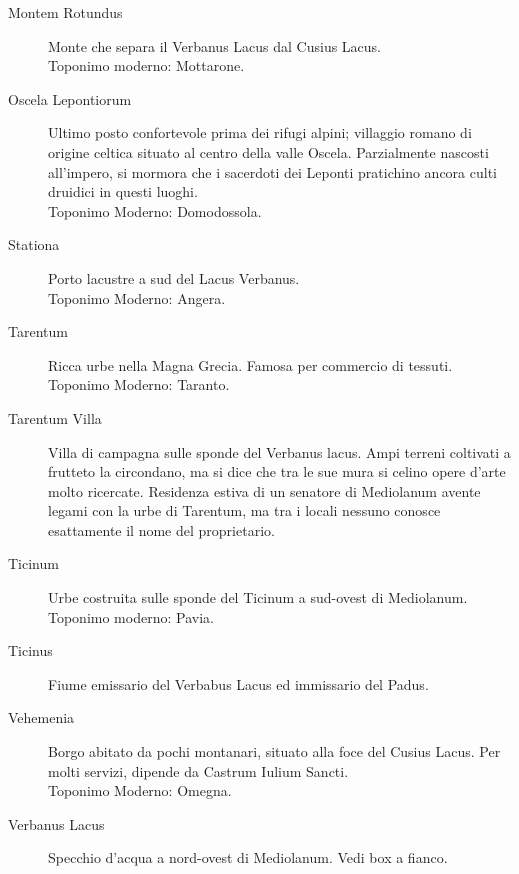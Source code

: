 \documentclass[11.5pt,twocolumn]{article}
\begin{document}
\begin{description}
\item[Montem Rotundus] Monte che separa il Verbanus Lacus dal Cusius Lacus.\\
Toponimo moderno: Mottarone.
\item[Oscela Lepontiorum] Ultimo posto confortevole prima dei rifugi alpini;
villaggio romano di origine celtica situato al centro della valle Oscela.
Parzialmente nascosti all'impero, si mormora che i sacerdoti dei Leponti pratichino ancora culti druidici in questi luoghi.
\\Toponimo Moderno: Domodossola.
\item[Stationa] Porto lacustre a sud del Lacus Verbanus.
\\Toponimo Moderno: Angera.
\item[Tarentum] Ricca urbe nella Magna Grecia. Famosa per commercio di tessuti.
\\Toponimo Moderno: Taranto.
\item[Tarentum Villa] Villa di campagna sulle sponde del Verbanus lacus.
Ampi terreni coltivati a frutteto la circondano, ma si dice che tra le sue mura si celino opere d'arte molto ricercate.
Residenza estiva di un senatore di Mediolanum avente legami con la urbe di Tarentum, ma tra i locali nessuno conosce esattamente il nome del proprietario.
\item[Ticinum] Urbe costruita sulle sponde del Ticinum a sud-ovest di Mediolanum.
\\Toponimo moderno: Pavia.
\item[Ticinus] Fiume emissario del Verbabus Lacus ed immissario del Padus.
\item[Vehemenia] Borgo abitato da pochi montanari, situato alla foce del Cusius Lacus.
Per molti servizi, dipende da Castrum Iulium Sancti.
\\Toponimo Moderno: Omegna.
\item[Verbanus Lacus] Specchio d'acqua a nord-ovest di Mediolanum. Vedi box a fianco.
\end{description}

%
\end{document}
